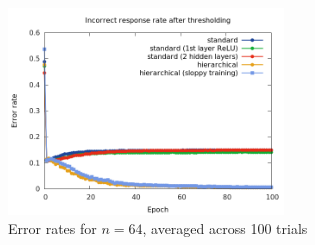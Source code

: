 \documentclass[10pt]{article}
\begin{document}
\begin{figure}[H]
    \centering
    \includegraphics[width=0.65\textwidth]{abstract_figure.png}
    \caption{Error rates for $n = 64$, averaged across 100 trials}
    \label{abstract_figure}
\end{figure}
\end{document}
